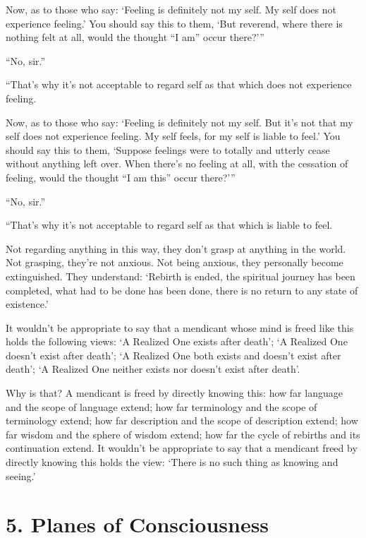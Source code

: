 \documentclass[12pt,openany]{book}%
\begin{document}
Now, as to those who say: ‘Feeling is definitely not my self. My self does not experience feeling.’ You should say this to them, ‘But reverend, where there is nothing felt at all, would the thought “I am” occur there?’” 

“No, sir.” 

“That’s why it’s not acceptable to regard self as that which does not experience feeling. 

Now, as to those who say: ‘Feeling is definitely not my self. But it’s not that my self does not experience feeling. My self feels, for my self is liable to feel.’ You should say this to them, ‘Suppose feelings were to totally and utterly cease without anything left over. When there’s no feeling at all, with the cessation of feeling, would the thought “I am this” occur there?’” 

“No, sir.” 

“That’s why it’s not acceptable to regard self as that which is liable to feel. 

Not regarding anything in this way, they don’t grasp at anything in the world. Not grasping, they’re not anxious. Not being anxious, they personally become extinguished. They understand: ‘Rebirth is ended, the spiritual journey has been completed, what had to be done has been done, there is no return to any state of existence.’ 

It wouldn’t be appropriate to say that a mendicant whose mind is freed like this holds the following views: ‘A Realized One exists after death’; ‘A Realized One doesn’t exist after death’; ‘A Realized One both exists and doesn’t exist after death’; ‘A Realized One neither exists nor doesn’t exist after death’. 

Why is that? A mendicant is freed by directly knowing this: how far language and the scope of language extend; how far terminology and the scope of terminology extend; how far description and the scope of description extend; how far wisdom and the sphere of wisdom extend; how far the cycle of rebirths and its continuation extend. It wouldn’t be appropriate to say that a mendicant freed by directly knowing this holds the view: ‘There is no such thing as knowing and seeing.’ 

\section*{5. Planes of Consciousness }
\end{document}
